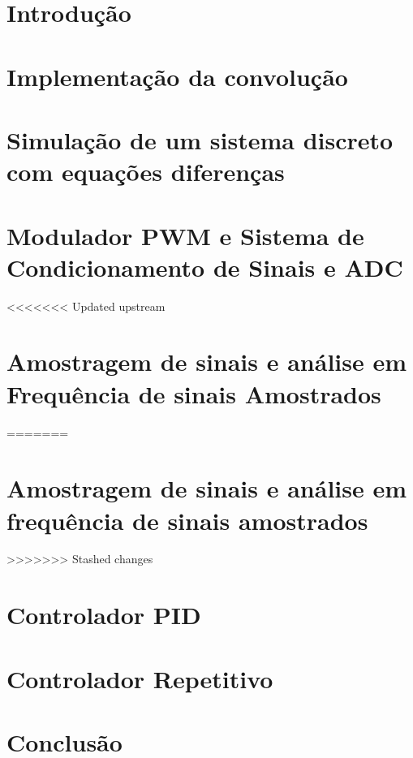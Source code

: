 \documentclass[capchap,sumarioincompleto,a4paper,12pt,ruledheader,normaltoc]{utfprtex}%
\begin{document}
\capa
\newpage
\sumario
\newpage
\newpage

\chapter{Introdução}

\chapter{Implementação da convolução}


\chapter{Simulação de um sistema discreto com equações diferenças}


\chapter{Modulador PWM e Sistema de Condicionamento de Sinais e ADC}


<<<<<<< Updated upstream
\chapter{Amostragem de sinais e análise em Frequência de sinais Amostrados}
=======
\chapter{Amostragem de sinais e análise em frequência de sinais amostrados}
>>>>>>> Stashed changes


\chapter{Controlador PID}


\chapter{Controlador Repetitivo}


%
%
%

\chapter{Conclusão}



\end{document}
